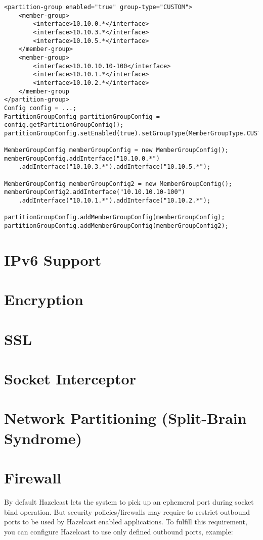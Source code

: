\begin{lstlisting}
<partition-group enabled="true" group-type="CUSTOM">
    <member-group>
        <interface>10.10.0.*</interface>
        <interface>10.10.3.*</interface>
        <interface>10.10.5.*</interface>
    </member-group>
    <member-group>
        <interface>10.10.10.10-100</interface>
        <interface>10.10.1.*</interface>
        <interface>10.10.2.*</interface>
    </member-group
</partition-group>
Config config = ...;
PartitionGroupConfig partitionGroupConfig = config.getPartitionGroupConfig();
partitionGroupConfig.setEnabled(true).setGroupType(MemberGroupType.CUSTOM);

MemberGroupConfig memberGroupConfig = new MemberGroupConfig();
memberGroupConfig.addInterface("10.10.0.*")
    .addInterface("10.10.3.*").addInterface("10.10.5.*");

MemberGroupConfig memberGroupConfig2 = new MemberGroupConfig();
memberGroupConfig2.addInterface("10.10.10.10-100")
    .addInterface("10.10.1.*").addInterface("10.10.2.*");

partitionGroupConfig.addMemberGroupConfig(memberGroupConfig);
partitionGroupConfig.addMemberGroupConfig(memberGroupConfig2);
\end{lstlisting}

\section{IPv6 Support}

\section{Encryption}

\section{SSL}

\section{Socket Interceptor}

\section{Network Partitioning (Split-Brain Syndrome)}

\section{Firewall}
By default Hazelcast lets the system to pick up an ephemeral port during socket bind operation. But security policies/firewalls may require to restrict outbound ports to be used by Hazelcast enabled applications. To fulfill this requirement, you can configure Hazelcast to use only defined outbound ports, example:

